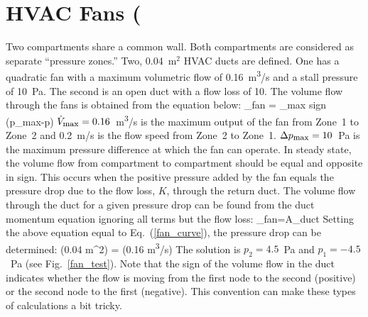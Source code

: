 \documentclass[11pt]{book}
\begin{document}
\clearpage

\section{HVAC Fans (\texorpdfstring{})}

Two compartments share a common wall. Both compartments are considered as
separate ``pressure zones.'' Two, 0.04~m$^2$ HVAC ducts are defined.  One has a quadratic fan with a maximum volumetric flow of 0.16~\si{m^3/s} and a stall pressure of 10~Pa.
The second is an open duct with a flow loss of 10. The volume flow through the fans is obtained from the equation below:
\be {}_{\hbox{\footnotesize fan}} = _{\hbox{\footnotesize max}} \;
   \hbox{sign} (\Delta p_{\hbox{\footnotesize max}}-\Delta p)
     \label{fan_curve} \ee
$\dot{V}_{\hbox{\footnotesize max}}=0.16$~\si{m^3/s} is the maximum output of the fan from
Zone~1 to Zone~2 and 0.2~m/s is the flow speed from Zone~2 to Zone~1. $\Delta p_{\hbox{\footnotesize max}}=10$~Pa is the maximum pressure difference at which the fan can operate. In steady state, the volume flow from compartment to compartment should be equal and opposite in sign.
This occurs when the positive pressure added by the fan equals the pressure drop due to the flow loss, $K$, through the return duct.  The volume flow through the duct for a given pressure drop can be found from the duct momentum equation ignoring all terms but the flow loss:
\be  {}_{\hbox{\footnotesize fan}}=A_{\hbox{\footnotesize duct}}  \ee
Setting the above equation equal to Eq.~(\ref{fan_curve}), the pressure drop can be determined:
\be  {} (0.04 \; \hbox{m}^2) =
   (0.16 \; \hbox{\si{m^3/s}})  \;
    \ee
The solution is $p_2=4.5$~Pa and $p_1=-4.5$~Pa (see Fig.~\ref{fan_test}). Note that the sign of the volume flow in the duct indicates whether the flow is moving from the first node to the second (positive) or the second node to the first (negative).
This convention can make these types of calculations a bit tricky.
\end{document}
